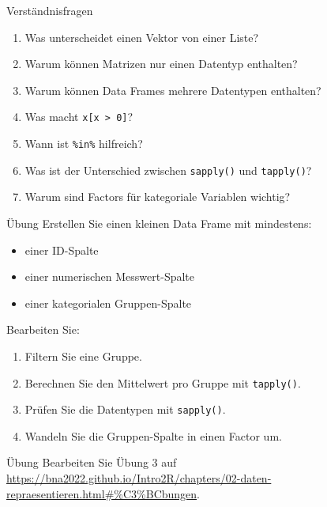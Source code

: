\documentclass[
  10pt,
  ignorenonframetext,
  aspectratio=169,
]{beamer}
\providecommand{\tightlist}{%
  \setlength{\itemsep}{0pt}\setlength{\parskip}{0pt}}
\begin{document}
\begin{frame}[fragile]{Verständnisfragen}
\label{verstuxe4ndnisfragen}
\begin{enumerate}
\tightlist
\item
  Was unterscheidet einen Vektor von einer Liste?
\item
  Warum können Matrizen nur einen Datentyp enthalten?
\item
  Warum können Data Frames mehrere Datentypen enthalten?
\item
  Was macht \texttt{x{[}x\ \textgreater{}\ 0{]}}?
\item
  Wann ist \texttt{\%in\%} hilfreich?
\item
  Was ist der Unterschied zwischen \texttt{sapply()} und
  \texttt{tapply()}?
\item
  Warum sind Factors für kategoriale Variablen wichtig?
\end{enumerate}
\end{frame}

\begin{frame}[fragile]{Übung}
\label{uxfcbung}
Erstellen Sie einen kleinen Data Frame mit mindestens:

\begin{itemize}
\tightlist
\item
  einer ID-Spalte
\item
  einer numerischen Messwert-Spalte
\item
  einer kategorialen Gruppen-Spalte
\end{itemize}

Bearbeiten Sie:

\begin{enumerate}
\tightlist
\item
  Filtern Sie eine Gruppe.
\item
  Berechnen Sie den Mittelwert pro Gruppe mit \texttt{tapply()}.
\item
  Prüfen Sie die Datentypen mit \texttt{sapply()}.
\item
  Wandeln Sie die Gruppen-Spalte in einen Factor um.
\end{enumerate}
\end{frame}

\begin{frame}{Übung}
\label{uxfcbung-1}
Bearbeiten Sie Übung 3 auf
\url{https://bna2022.github.io/Intro2R/chapters/02-daten-repraesentieren.html\#\%C3\%BCbungen}.
\end{frame}
\end{document}
